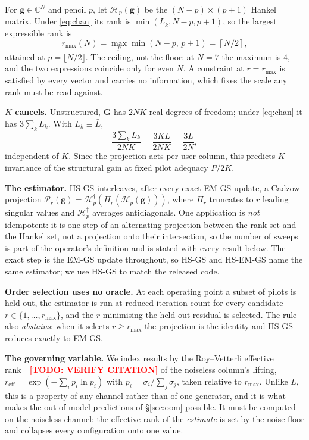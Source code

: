 \documentclass[journal]{IEEEtran}
\newcommand{\todo}[1]{\textcolor{red}{\textbf{[TODO: #1]}}}
\newcommand{\bG}{\mathbf{G}}
\newcommand{\bg}{\mathbf{g}}
\newcommand{\Hank}{\mathcal{H}}
\newcommand{\reff}{r_{\mathrm{eff}}}
\newcommand{\rmax}{r_{\max}}
\begin{document}
For $\bg\in\mathbb{C}^N$ and pencil $p$, let $\Hank_p(\bg)$ be the
$(N-p)\times(p+1)$ Hankel matrix. Under \eqref{eq:chan} its rank is
$\min(L_k,N-p,p+1)$, so the largest expressible rank is
\begin{equation}
\rmax(N)=\max_{p}\min(N-p,\,p+1)=\left\lceil N/2\right\rceil,
\label{eq:cap}
\end{equation}
attained at $p=\lfloor N/2\rfloor$. The ceiling, not the floor: at $N=7$ the
maximum is $4$, and the two expressions coincide only for even $N$. A
constraint at $r=\rmax$ is satisfied by every vector and carries no
information, which fixes the scale any rank must be read against.

\textbf{$K$ cancels.} Unstructured, $\bG$ has $2NK$ real degrees of freedom;
under \eqref{eq:chan} it has $3\sum_k L_k$. With $L_k\equiv\bar L$,
\begin{equation}
\frac{3\sum_k L_k}{2NK}=\frac{3K\bar L}{2NK}=\frac{3\bar L}{2N},
\label{eq:compress}
\end{equation}
independent of $K$. Since the projection acts per user column, this predicts
$K$-invariance of the structural gain at fixed pilot adequacy $P/2K$.

\textbf{The estimator.} HS-GS interleaves, after every exact EM-GS update, a
Cadzow projection $\mathcal{P}_r(\bg)=\Hank_p^{\dagger}(\Pi_r(\Hank_p(\bg)))$,
where $\Pi_r$ truncates to $r$ leading singular values and $\Hank_p^{\dagger}$
averages antidiagonals. One application is \emph{not} idempotent: it is one
step of an alternating projection between the rank set and the Hankel set, not
a projection onto their intersection, so the number of sweeps is part of the
operator's definition and is stated with every result below. The exact step is
the EM-GS update throughout, so HS-GS and HS-EM-GS name the same estimator; we
use HS-GS to match the released code.

\textbf{Order selection uses no oracle.} At each operating point a subset of
pilots is held out, the estimator is run at reduced iteration count for every
candidate $r\in\{1,\dots,\rmax\}$, and the $r$ minimising the held-out residual
is selected. The rule also \emph{abstains}: when it selects $r\ge\rmax$ the
projection is the identity and HS-GS reduces exactly to EM-GS.

\textbf{The governing variable.} We index results by the Roy--Vetterli
effective rank~\cite{royvetterli2007}~\todo{VERIFY CITATION} of the noiseless
column's lifting, $\reff=\exp(-\sum_i p_i\ln p_i)$ with
$p_i=\sigma_i/\sum_j\sigma_j$, taken relative to $\rmax$. Unlike $L$, this is a
property of any channel rather than of one generator, and it is what makes the
out-of-model predictions of \S\ref{sec:oom} possible. It must be computed on
the noiseless channel: the effective rank of the \emph{estimate} is set by the
noise floor and collapses every configuration onto one value.
\end{document}
